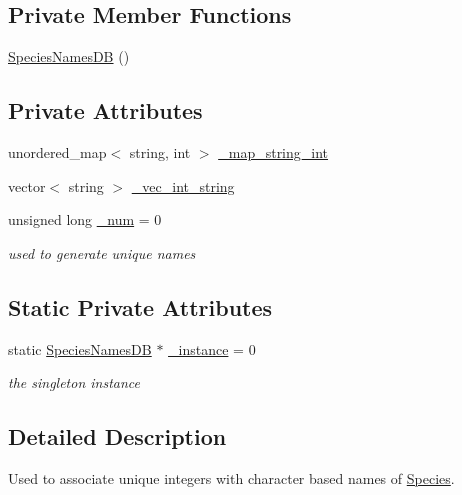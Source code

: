 \subsection*{Private Member Functions}
\begin{DoxyCompactItemize}
\item 
\hyperlink{classSpeciesNamesDB_ac95818ac6b9abaf298b1b32c518a938b}{Species\+Names\+D\+B} ()
\end{DoxyCompactItemize}
\subsection*{Private Attributes}
\begin{DoxyCompactItemize}
\item 
unordered\+\_\+map$<$ string, int $>$ \hyperlink{classSpeciesNamesDB_a102ccdb08c93602260cff62cbf7d712a}{\+\_\+map\+\_\+string\+\_\+int}
\item 
vector$<$ string $>$ \hyperlink{classSpeciesNamesDB_a668ee868496f58154d860caef5fc64cc}{\+\_\+vec\+\_\+int\+\_\+string}
\item 
unsigned long \hyperlink{classSpeciesNamesDB_a8339994ccc621359cf8de735865be6a7}{\+\_\+num} = 0
\begin{DoxyCompactList}\small\item\em used to generate unique names \end{DoxyCompactList}\end{DoxyCompactItemize}
\subsection*{Static Private Attributes}
\begin{DoxyCompactItemize}
\item 
static \hyperlink{classSpeciesNamesDB}{Species\+Names\+D\+B} $\ast$ \hyperlink{classSpeciesNamesDB_aa47f96058594e809c9da48eef415ce8b}{\+\_\+instance} = 0
\begin{DoxyCompactList}\small\item\em the singleton instance \end{DoxyCompactList}\end{DoxyCompactItemize}


\subsection{Detailed Description}
Used to associate unique integers with character based names of \hyperlink{classSpecies}{Species}. 

